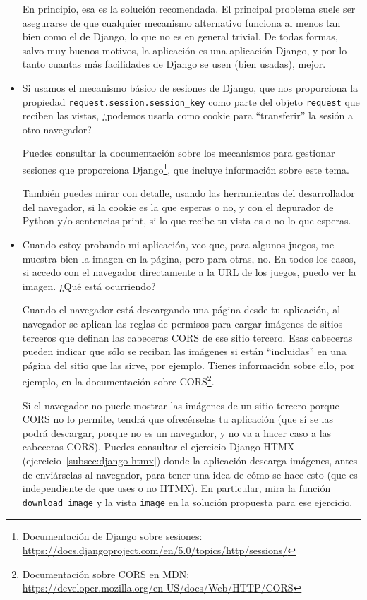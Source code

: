 \begin{itemize}
  En principio, esa es la solución recomendada. El principal problema suele ser asegurarse de que cualquier mecanismo alternativo funciona al menos tan bien como el de Django, lo que no es en general trivial. De todas formas, salvo muy buenos motivos, la aplicación es una aplicación Django, y por lo tanto cuantas más facilidades de Django se usen (bien usadas), mejor.

\item Si usamos el mecanismo básico de sesiones de Django, que nos proporciona la propiedad \texttt{request.session.session\_key} como parte del objeto \texttt{request} que reciben las vistas, ¿podemos usarla como cookie para ``transferir'' la sesión a otro navegador?

  Puedes consultar la documentación sobre los mecanismos para gestionar sesiones que proporciona Django\footnote{Documentación de Django sobre sesiones:\\
    \url{https://docs.djangoproject.com/en/5.0/topics/http/sessions/}}, que incluye información sobre este tema.

  También puedes mirar con detalle, usando las herramientas del desarrollador del navegador, si la cookie es la que esperas o no, y con el depurador de Python y/o sentencias print, si lo que recibe tu vista es o no lo que esperas.

\item Cuando estoy probando mi aplicación, veo que, para algunos juegos, me muestra bien la imagen en la página, pero para otras, no. En todos los casos, si accedo con el navegador directamente a la URL de los juegos, puedo ver la imagen. ¿Qué está ocurriendo?

  Cuando el navegador está descargando una página desde tu aplicación, al navegador se aplican las reglas de permisos para cargar imágenes de sitios terceros que definan las cabeceras CORS de ese sitio tercero. Esas cabeceras pueden indicar que sólo se reciban las imágenes si están ``incluidas'' en una página del sitio que las sirve, por ejemplo. Tienes información sobre ello, por ejemplo, en la documentación sobre CORS\footnote{Documentación sobre CORS en MDN: \\
    \url{https://developer.mozilla.org/en-US/docs/Web/HTTP/CORS}}.

  Si el navegador no puede mostrar las imágenes de un sitio tercero porque CORS no lo permite, tendrá que ofrecérselas tu aplicación (que sí se las podrá descargar, porque no es un navegador, y no va a hacer caso a las cabeceras CORS). Puedes consultar el ejercicio Django HTMX (ejercicio~\ref{subsec:django-htmx}) donde la aplicación descarga imágenes, antes de enviárselas al navegador, para tener una idea de cómo se hace esto (que es independiente de que uses o no HTMX). En particular, mira la función \texttt{download\_image} y la vista \texttt{image} en la solución propuesta para ese ejercicio.
  

\end{itemize}
